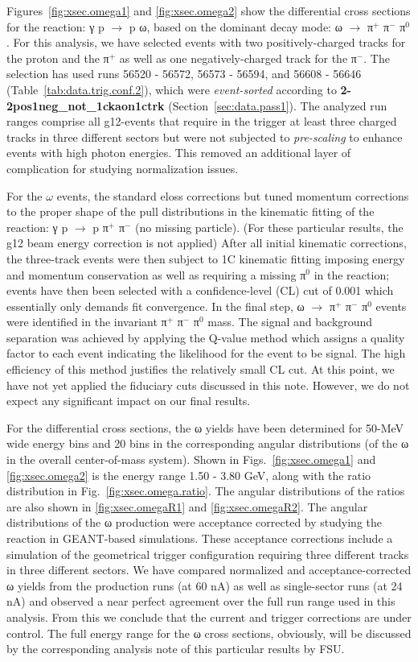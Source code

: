 Figures~\ref{fig:xsec.omega1} and \ref{fig:xsec.omega2} show the differential cross sections for the reaction: γ p $\rightarrow$ p ω, based on the dominant decay mode: ω $\rightarrow$ π$^+$ π$^-$ π$^0$. For this analysis, we have selected events with two positively-charged tracks for the proton and the π$^+$ as well as one negatively-charged track for the π$^-$. The selection has used runs 56520 - 56572, 56573 - 56594, and 56608 - 56646 (Table~\ref{tab:data.trig.conf.2}), which were {\it event-sorted} according to {\bf 2-2pos1neg\_not\_1ckaon1ctrk} (Section~\ref{sec:data.pass1}). The analyzed run ranges comprise all g12-events that require in the trigger at least three charged tracks in three different sectors but were not subjected to {\it pre-scaling} to enhance events with high photon energies. This removed an additional layer of complication for studying normalization issues.

For the $\omega$ events, the standard {\sc eloss} corrections but tuned momentum corrections to the proper shape of the pull distributions in the kinematic fitting of the reaction: γ p $\rightarrow$ p π$^+$ π$^-$ (no missing particle). (For these particular results, the g12 beam energy correction is not applied) After all initial kinematic corrections, the three-track events were then subject to 1C kinematic fitting imposing energy and momentum conservation as well as requiring a missing π$^0$ in the reaction; events have then been selected with a confidence-level (CL) cut of 0.001 which essentially only demands fit convergence. In the final step, ω $\rightarrow$ π$^+$ π$^-$ π$^0$ events were identified in the invariant π$^+$ π$^-$ π$^0$ mass. The signal and background separation was achieved by applying the Q-value method which assigns a quality factor to each event indicating the likelihood for the event to be signal. The high efficiency of this method justifies the relatively small CL cut. At this point, we have not yet applied the fiduciary cuts discussed in this note. However, we do not expect any significant impact on our final results.

For the differential cross sections, the ω yields have been determined for 50-MeV wide energy bins and 20 bins in the corresponding angular distributions (of the ω in the overall center-of-mass system). Shown in Figs.~\ref{fig:xsec.omega1} and \ref{fig:xsec.omega2} is the energy range 1.50 - 3.80 GeV, along with the ratio distribution in Fig.~\ref{fig:xsec.omega.ratio}. The angular distributions of the ratios are also shown in  \ref{fig:xsec.omegaR1} and  \ref{fig:xsec.omegaR2}.  The angular distributions of the ω production were acceptance corrected by studying the reaction in GEANT-based simulations. These acceptance corrections include a simulation of the geometrical trigger configuration requiring three different tracks in three different sectors.  We have compared normalized and acceptance-corrected ω yields from the production runs (at 60 nA) as well as single-sector runs (at 24 nA) and observed a near perfect agreement over the full run range used in this analysis. From this we conclude that the current and trigger corrections are under control. The full energy range for the ω cross sections, obviously, will be discussed by the corresponding analysis note of this particular results by FSU.

